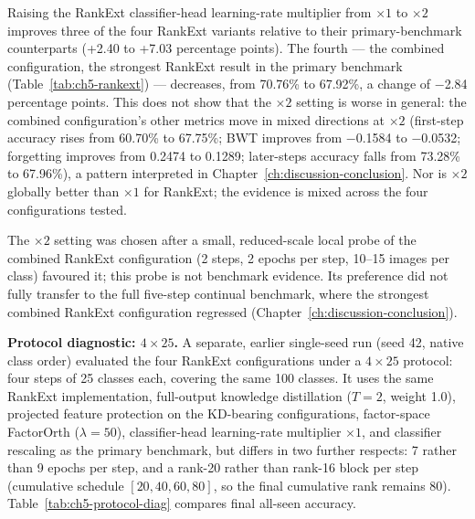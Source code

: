 Raising the RankExt classifier-head learning-rate multiplier from
$\times1$ to $\times2$ improves three of the four RankExt variants relative
to their primary-benchmark counterparts (+2.40 to +7.03 percentage points). The
fourth --- the combined configuration, the strongest RankExt result in the
primary benchmark (Table~\ref{tab:ch5-rankext}) --- decreases, from 70.76\%
to 67.92\%, a change of $-$2.84 percentage points. This does not show that
the $\times2$ setting is worse in general: the combined configuration's
other metrics move in mixed directions at $\times2$ (first-step accuracy
rises from 60.70\% to 67.75\%; BWT improves from $-$0.1584 to $-$0.0532;
forgetting improves from 0.2474 to 0.1289; later-steps accuracy falls from
73.28\% to 67.96\%), a pattern interpreted in
Chapter~\ref{ch:discussion-conclusion}. Nor is $\times2$ globally better
than $\times1$ for RankExt; the evidence is mixed across the four
configurations tested.

The $\times2$ setting was chosen after a small, reduced-scale local probe
of the combined RankExt configuration (2 steps, 2 epochs per step, 10--15
images per class) favoured it; this probe is not benchmark evidence. Its
preference did not fully transfer to the full five-step continual
benchmark, where the strongest combined RankExt configuration regressed
(Chapter~\ref{ch:discussion-conclusion}).

\textbf{Protocol diagnostic: $4\times25$.} A separate, earlier single-seed
run (seed 42, native class order) evaluated the four RankExt configurations
under a $4\times25$ protocol: four steps of 25 classes each, covering the
same 100 classes. It uses the same RankExt implementation, full-output
knowledge distillation ($T=2$, weight 1.0), projected feature protection on
the KD-bearing configurations, factor-space FactorOrth ($\lambda=50$),
classifier-head learning-rate multiplier $\times1$, and classifier
rescaling as the primary benchmark, but differs in two further respects:
7 rather than 9 epochs per step, and a rank-20 rather than rank-16 block per
step (cumulative schedule $[20,40,60,80]$, so the final cumulative rank
remains 80). Table~\ref{tab:ch5-protocol-diag} compares final all-seen
accuracy.

